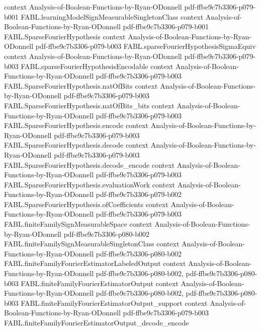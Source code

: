 \begin{theorem}
  {context}
  {Analysis-of-Boolean-Functions-by-Ryan-ODonnell}
  {pdf-ffbe9c7b3306-p079-b001}
\proofstep
  {FABL.learningModelSignMeasurableSingletonClass}
  {context}
  {Analysis-of-Boolean-Functions-by-Ryan-ODonnell}
  {pdf-ffbe9c7b3306-p079-b001}
\proofstep
  {FABL.SparseFourierHypothesis}
  {context}
  {Analysis-of-Boolean-Functions-by-Ryan-ODonnell}
  {pdf-ffbe9c7b3306-p079-b003}
\proofstep
  {FABL.sparseFourierHypothesisSigmaEquiv}
  {context}
  {Analysis-of-Boolean-Functions-by-Ryan-ODonnell}
  {pdf-ffbe9c7b3306-p079-b003}
\proofstep
  {FABL.sparseFourierHypothesisEncodable}
  {context}
  {Analysis-of-Boolean-Functions-by-Ryan-ODonnell}
  {pdf-ffbe9c7b3306-p079-b003}
\proofstep
  {FABL.SparseFourierHypothesis.natOfBits}
  {context}
  {Analysis-of-Boolean-Functions-by-Ryan-ODonnell}
  {pdf-ffbe9c7b3306-p079-b003}
\proofstep
  {FABL.SparseFourierHypothesis.natOfBits_bits}
  {context}
  {Analysis-of-Boolean-Functions-by-Ryan-ODonnell}
  {pdf-ffbe9c7b3306-p079-b003}
\proofstep
  {FABL.SparseFourierHypothesis.encode}
  {context}
  {Analysis-of-Boolean-Functions-by-Ryan-ODonnell}
  {pdf-ffbe9c7b3306-p079-b003}
\proofstep
  {FABL.SparseFourierHypothesis.decode}
  {context}
  {Analysis-of-Boolean-Functions-by-Ryan-ODonnell}
  {pdf-ffbe9c7b3306-p079-b003}
\proofstep
  {FABL.SparseFourierHypothesis.decode_encode}
  {context}
  {Analysis-of-Boolean-Functions-by-Ryan-ODonnell}
  {pdf-ffbe9c7b3306-p079-b003}
\proofstep
  {FABL.SparseFourierHypothesis.evaluationWork}
  {context}
  {Analysis-of-Boolean-Functions-by-Ryan-ODonnell}
  {pdf-ffbe9c7b3306-p079-b002}
\proofstep
  {FABL.SparseFourierHypothesis.ofCoefficients}
  {context}
  {Analysis-of-Boolean-Functions-by-Ryan-ODonnell}
  {pdf-ffbe9c7b3306-p079-b003}
\proofstep
  {FABL.finiteFamilySignMeasurableSpace}
  {context}
  {Analysis-of-Boolean-Functions-by-Ryan-ODonnell}
  {pdf-ffbe9c7b3306-p080-b002}
\proofstep
  {FABL.finiteFamilySignMeasurableSingletonClass}
  {context}
  {Analysis-of-Boolean-Functions-by-Ryan-ODonnell}
  {pdf-ffbe9c7b3306-p080-b002}
\proofstep
  {FABL.finiteFamilyFourierEstimatorLabeledOutput}
  {context}
  {Analysis-of-Boolean-Functions-by-Ryan-ODonnell}
  {pdf-ffbe9c7b3306-p080-b002,
    pdf-ffbe9c7b3306-p080-b003}
\proofstep
  {FABL.finiteFamilyFourierEstimatorOutput}
  {context}
  {Analysis-of-Boolean-Functions-by-Ryan-ODonnell}
  {pdf-ffbe9c7b3306-p080-b002,
    pdf-ffbe9c7b3306-p080-b003}
\proofstep
  {FABL.finiteFamilyFourierEstimatorOutput_support}
  {context}
  {Analysis-of-Boolean-Functions-by-Ryan-ODonnell}
  {pdf-ffbe9c7b3306-p079-b003}
\proofstep
  {FABL.finiteFamilyFourierEstimatorOutput_decode_encode}

\end{theorem}
